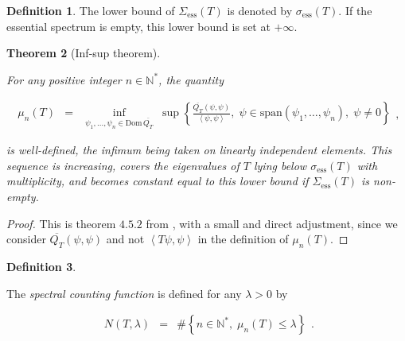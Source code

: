 \documentclass{jams-l}
\newtheorem{theorem}{Theorem}[section]
\theoremstyle{definition}
\newtheorem{definition}[theorem]{Definition}
\theoremstyle{remark}
\numberwithin{equation}{section}
\begin{document}
        \begin{definition}
        
            The lower bound of $\Sigma_{\mathrm{ess}} \left( T \right)$ is denoted by $\sigma_{\mathrm{ess}} \left( T \right)$. If the essential spectrum is empty, this lower bound is set at $+ \infty$.
        
        \end{definition}
        
        \begin{theorem}[Inf-sup theorem]
        \label{ThmInfSup}
        
            For any positive integer $n \in \mathbb{N}^{\ast}$, the quantity
            
            \[ \begin{array}{lll}
                    \mu_n \left( T \right) & = & \inf\limits_{\psi_1, \dots, \psi_n \in \mathrm{Dom} \, \overline{Q_T}} \; \sup \left \{ \frac{\overline{Q_T} \left( \psi, \psi \right)}{\left< \psi, \psi \right>}, \; \psi \in \mathrm{span} \left( \psi_1, \dots, \psi_n \right), \; \psi \neq 0 \right \}
                \end{array} , \]
            
            \noindent is well-defined, the infimum being taken on linearly independent elements. This sequence is increasing, covers the eigenvalues of $T$ lying below $\sigma_{\mathrm{ess}} \left( T \right)$ with multiplicity, and becomes constant equal to this lower bound if $\Sigma_{\mathrm{ess}} \left( T \right)$ is non-empty.
        
        \end{theorem}
        
        \begin{proof}
        
            This is theorem $4.5.2$ from \cite{MR1349825}, with a small and direct adjustment, since we consider $\overline{Q_T} \left( \psi, \psi \right)$ and not $\left< T \psi, \psi \right>$ in the definition of $\mu_n \left( T \right)$.
        
        \end{proof}
        
        \begin{definition}
        \label{DefSpectralCountingFunction}
        
            The \textit{spectral counting function} is defined for any $\lambda > 0$ by
            
            \[ \begin{array}{lll}
                    N \left( T, \lambda \right) & = & \# \left \{ n \in \mathbb{N}^{\ast}, \; \mu_n \left( T \right) \leqslant \lambda \right \}
                \end{array} . \]
        
        \end{definition}
        
\end{document}
